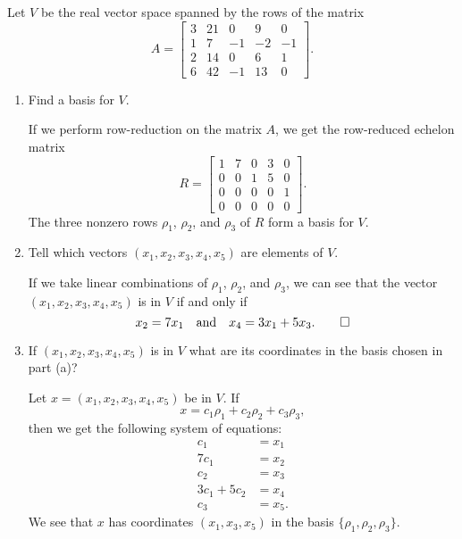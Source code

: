  Let $V$ be the real vector space spanned by the rows of the
matrix
\begin{equation*}
  A =
  \begin{bmatrix}
    3 & 21 & 0 & 9 & 0 \\
    1 & 7 & -1 & -2 & -1 \\
    2 & 14 & 0 & 6 & 1 \\
    6 & 42 & -1 & 13 & 0
  \end{bmatrix}.
\end{equation*}
\begin{enumerate}
\item Find a basis for $V$.
  \begin{solution}
    If we perform row-reduction on the matrix $A$, we get the
    row-reduced echelon matrix
    \begin{equation*}
      R =
      \begin{bmatrix}
        1 & 7 & 0 & 3 & 0 \\
        0 & 0 & 1 & 5 & 0 \\
        0 & 0 & 0 & 0 & 1 \\
        0 & 0 & 0 & 0 & 0
      \end{bmatrix}.
    \end{equation*}
    The three nonzero rows $\rho_1$, $\rho_2$, and $\rho_3$ of $R$
    form a basis for $V$.
  \end{solution}
\item Tell which vectors $(x_1, x_2, x_3, x_4, x_5)$ are elements of
  $V$.
  \begin{solution}
    If we take linear combinations of $\rho_1$, $\rho_2$, and
    $\rho_3$, we can see that the vector $(x_1,x_2,x_3,x_4,x_5)$ is in
    $V$ if and only if
    \begin{equation*}
      x_2 = 7x_1 \quad\text{and}\quad
      x_4 = 3x_1 + 5x_3. \qedhere
    \end{equation*}
  \end{solution}
\item If $(x_1,x_2,x_3,x_4,x_5)$ is in $V$ what are its coordinates in
  the basis chosen in part (a)?
  \begin{solution}
    Let $x = (x_1,x_2,x_3,x_4,x_5)$ be in $V$. If
    \begin{equation*}
      x = c_1\rho_1 + c_2\rho_2 + c_3\rho_3,
    \end{equation*}
    then we get the following system of equations:
    \begin{align*}
      c_1 &= x_1 \\
      7c_1 &= x_2 \\
      c_2 &= x_3 \\
      3c_1 + 5c_2 &= x_4 \\
      c_3 &= x_5.
    \end{align*}
    We see that $x$ has coordinates $(x_1, x_3, x_5)$ in the basis
    $\{\rho_1,\rho_2,\rho_3\}$.
  \end{solution}
\end{enumerate}

